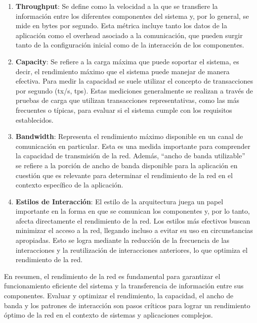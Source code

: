 \documentclass{article}
\begin{document}
 		
 		\begin{enumerate}
 			\item \textbf{Throughput}: Se define como la velocidad a la que se transfiere la información entre los diferentes componentes del sistema y, por lo general, se mide en bytes por segundo. Esta métrica incluye tanto los datos de la aplicación como el overhead asociado a la comunicación, que pueden surgir tanto de la configuración inicial como de la interacción de los componentes.
 			
 			\item \textbf{Capacity}: Se refiere a la carga máxima que puede soportar el sistema, es decir, el rendimiento máximo que el sistema puede manejar de manera efectiva. Para medir la capacidad se suele utilizar el concepto de transacciones por segundo (tx/s, tps). Estas mediciones generalmente se realizan a través de pruebas de carga que utilizan transacciones representativas, como las más frecuentes o típicas, para evaluar si el sistema cumple con los requisitos establecidos.	
 			
 			 			
 			\item \textbf{Bandwidth}\label{sec:bandwidth}: Representa el rendimiento máximo disponible en un canal de comunicación en particular. Esta es una medida importante para comprender la capacidad de transmisión de la red. Además, ``ancho de banda utilizable'' se refiere a la porción de ancho de banda disponible para la aplicación en cuestión que es relevante para determinar el rendimiento de la red en el contexto específico de la aplicación.
 			
 						
 			\item \textbf{Estilos de Interacción}: El estilo de la arquitectura juega un papel importante en la forma en que se comunican los componentes y, por lo tanto, afecta directamente el rendimiento de la red. Los estilos más efectivos buscan minimizar el acceso a la red, llegando incluso a evitar su uso en circunstancias apropiadas. Esto se logra mediante la reducción de la frecuencia de las interacciones y la reutilización de interacciones anteriores, lo que optimiza el rendimiento de la red.
 			
 					 	
 		\end{enumerate}
 		
 		En resumen, el rendimiento de la red es fundamental para garantizar el funcionamiento eficiente del sistema y la transferencia de información entre sus componentes. Evaluar y optimizar el rendimiento, la capacidad, el ancho de banda y los patrones de interacción son pasos críticos para lograr un rendimiento óptimo de la red en el contexto de sistemas y aplicaciones complejos.
 		
\end{document}
